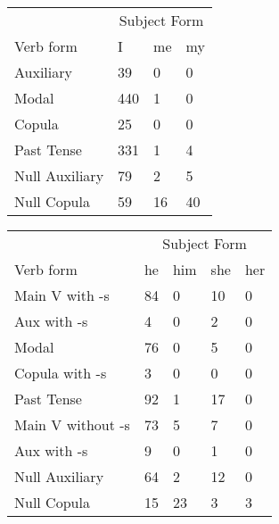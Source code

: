 \begin{table}[]
    \begin{minipage}{0.5\textwidth}
    \centering
    \begin{tabular}{@{}llll@{}}
        \toprule
            &\multicolumn{3}{c}{Subject Form}\\
            \cline{2-4}
        Verb form & I & me & my \\
        \midrule
        Auxiliary & 39 & 0 & 0 \\
        Modal & 440 & 1 & 0 \\
        Copula & 25 & 0 & 0 \\
        Past Tense & 331 & 1 & 4 \\
        \hline
        Null Auxiliary & 79 & 2 & 5 \\
        Null Copula & 59 & 16 & 40 \\
        \bottomrule
    \end{tabular}
\end{minipage}
\begin{minipage}{0.5\textwidth}
    \centering
    \begin{tabular}{@{}lllll@{}}
        \toprule
            &\multicolumn{4}{c}{Subject Form}\\
            \cline{2-5}
        Verb form & he & him & she & her \\
        \midrule
        Main V with -s & 84 & 0 & 10 & 0 \\
        Aux with -s & 4 & 0 & 2 & 0 \\
        Modal & 76 & 0 & 5 & 0 \\
        Copula with -s & 3 & 0 & 0 & 0 \\
        Past Tense & 92 & 1 & 17 & 0 \\
        \hline
        Main V without -s & 73 & 5 & 7 & 0 \\
        Aux with -s & 9 & 0 & 1 & 0 \\
        Null Auxiliary & 64 & 2 & 12 & 0 \\
        Null Copula & 15 & 23 & 3 & 3 \\
        \bottomrule
    \end{tabular}
\end{minipage}
\end{table}
